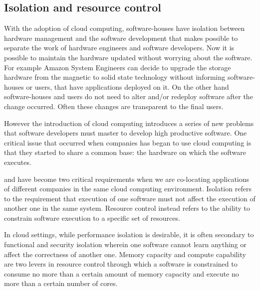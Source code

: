 \subsection*{Isolation and resource control}
\label{sec:problemSpace-cloudComputing-isolationResource}
With the adoption of cloud computing, software-houses have isolation between hardware management and the software
development that makes possible to separate the work of hardware engineers and software developers.
Now it is possible to maintain the hardware updated without worrying about the software. For example Amazon
System Engineers can decide to upgrade the storage hardware from the magnetic to solid state technology without
informing software-houses or users, that have applications deployed on it. On the other hand software-houses
and users do not need to alter and/or redeploy software after the change occurred. Often these changes are
transparent to the final users. 

However the introduction of cloud computing introduces a series of new problems that software developers must
master to develop high productive software. One critical issue that occurred when companies has began to use cloud 
computing is that they started to share a common base: the hardware on which the software executes.

 and  have become two critical requirements when we are co-locating
applications of different companies in the same cloud computing environment. Isolation refers to the requirement
that execution of one software must not affect the execution of another one in the same system. Resource control
instead refers to the ability to constrain software execution to a specific set of resources.

In cloud settings, while performance isolation is desirable, it is often secondary to functional and security
isolation wherein one software cannot learn anything or affect the correctness of another one. Memory capacity
and compute capability are two levers in resource control through which a software is constrained to consume
no more than a certain amount of memory capacity and execute no more than a certain number of cores.